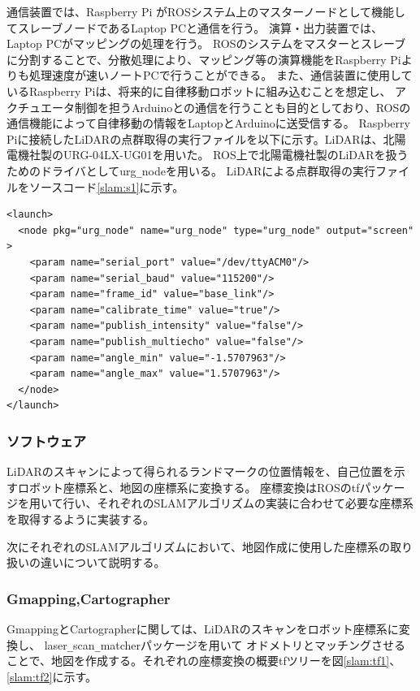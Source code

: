 通信装置では、Raspberry Pi がROSシステム上のマスターノードとして機能してスレーブノードであるLaptop PCと通信を行う。
演算・出力装置では、Laptop PCがマッピングの処理を行う。
ROSのシステムをマスターとスレーブに分割することで、分散処理により、マッピング等の演算機能をRaspberry Piよりも処理速度が速いノートPCで行うことができる。
また、通信装置に使用しているRaspberry Piは、将来的に自律移動ロボットに組み込むことを想定し、
アクチュエータ制御を担うArduinoとの通信を行うことも目的としており、ROSの通信機能によって自律移動の情報をLaptopとArduinoに送受信する。
Raspberry Piに接続したLiDARの点群取得の実行ファイルを以下に示す。LiDARは、北陽電機社製のURG-04LX-UG01を用いた。
ROS上で北陽電機社製のLiDARを扱うためのドライバとしてurg\verb|_|node\cite{slam:urg}を用いる。
LiDARによる点群取得の実行ファイルをソースコード\ref{slam:s1}に示す。

\begin{lrbox}{\mybox}
  \begin{lstlisting}[caption=LiDARによる点群取得の実行ファイル,label=slam:s1]
<launch>
  <node pkg="urg_node" name="urg_node" type="urg_node" output="screen" >
    <param name="serial_port" value="/dev/ttyACM0"/>
    <param name="serial_baud" value="115200"/>
    <param name="frame_id" value="base_link"/>
    <param name="calibrate_time" value="true"/>
    <param name="publish_intensity" value="false"/>
    <param name="publish_multiecho" value="false"/>
    <param name="angle_min" value="-1.5707963"/>
    <param name="angle_max" value="1.5707963"/>
  </node>
</launch>
  \end{lstlisting}
\end{lrbox}
\scalebox{.9}{\usebox{\mybox}}

\subsubsection{ソフトウェア}
LiDARのスキャンによって得られるランドマークの位置情報を、自己位置を示すロボット座標系と、地図の座標系に変換する。
座標変換はROSのtf\cite{slam:tf}パッケージを用いて行い、それぞれのSLAMアルゴリズムの実装に合わせて必要な座標系を取得するように実装する。

次にそれぞれのSLAMアルゴリズムにおいて、地図作成に使用した座標系の取り扱いの違いについて説明する。

\subsubsection{Gmapping,Cartographer}
GmappingとCartographerに関しては、LiDARのスキャンをロボット座標系に変換し、
laser\verb|_|scan\verb|_|matcher\cite{slam:laser}パッケージを用いて
オドメトリとマッチングさせることで、地図を作成する。それぞれの座標変換の概要tfツリーを図\ref{slam:tf1}、\ref{slam:tf2}に示す。


